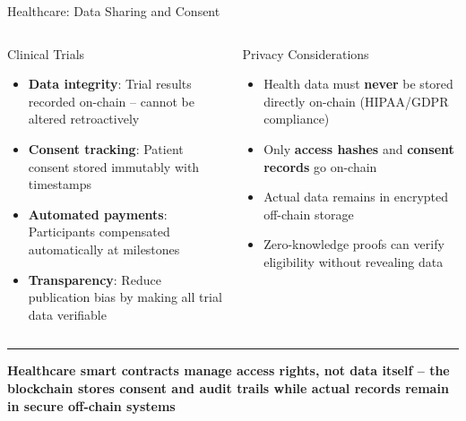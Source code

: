 \documentclass[8pt,aspectratio=169]{beamer}
\newcommand{\bottomnote}[1]{\vfill\vspace{-2mm}\textcolor{mllavender2}{\rule{\textwidth}{0.4pt}}\vspace{1mm}\footnotesize\textbf{#1}}
\begin{document}
\begin{frame}{Healthcare: Data Sharing and Consent}
\begin{columns}[T]
\begin{block}{Clinical Trials}
\footnotesize
\begin{itemize}
  \item \textbf{Data integrity}: Trial results recorded on-chain -- cannot be altered retroactively
  \item \textbf{Consent tracking}: Patient consent stored immutably with timestamps
  \item \textbf{Automated payments}: Participants compensated automatically at milestones
  \item \textbf{Transparency}: Reduce publication bias by making all trial data verifiable
\end{itemize}
\end{block}
\vspace{2mm}
\begin{alertblock}{Privacy Considerations}
\footnotesize
\begin{itemize}
  \item Health data must \textbf{never} be stored directly on-chain (HIPAA/GDPR compliance)
  \item Only \textbf{access hashes} and \textbf{consent records} go on-chain
  \item Actual data remains in encrypted off-chain storage
  \item Zero-knowledge proofs can verify eligibility without revealing data
\end{itemize}
\end{alertblock}
\end{columns}
\bottomnote{Healthcare smart contracts manage access rights, not data itself -- the blockchain stores consent and audit trails while actual records remain in secure off-chain systems}
\end{frame}
\end{document}

